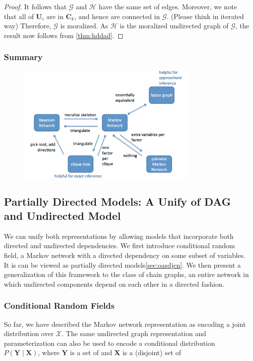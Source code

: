 \documentclass{article}
\begin{document}
\begin{proof}
 It follows that $\mathcal{G}$ and $\mathcal{H}$ have the same set of edges. Moreover, we note that all of $\boldsymbol{U}_{i}$ are in $\boldsymbol{C}_{k}$, and hence are connected in $\mathcal{G}$. (Please think in iterated way) Therefore, $\mathcal{G}$ is moralized. As $\mathcal{H}$ is the moralized undirected graph of $\mathcal{G}$, the result now follows from \cref{thm:hddad}.
\end{proof}


\subsubsection{Summary}
\begin{figure}[H]
    \centering
    \includegraphics[width=0.8\textwidth]{Figs/a21.png}
\end{figure}
\subsection{Partially Directed Models: A Unify of DAG and Undirected Model}
We can unify both representations by allowing models that incorporate both directed and undirected dependencies.
We first introduce conditional random field, a Markov network with a directed dependency on some subset of variables. It is can be viewed as  partially directed models\cref{sec:oasdjcn}. We then present a generalization of this framework to the class of chain graphs, an entire network in which undirected components depend on each other in a directed fashion.
\subsubsection{Conditional Random Fields}\label{sec:crf}
So far, we have described the Markov network representation as encoding a joint distribution over $\mathcal{X}$. The same undirected graph representation and parameterization can also be used to encode a conditional distribution $P(\boldsymbol{Y} \mid \boldsymbol{X})$, where $\boldsymbol{Y}$ is a set of  and $\boldsymbol{X}$ is a (disjoint) set of 
\end{document}
